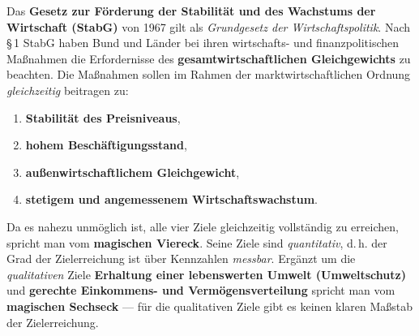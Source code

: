 \documentclass[11pt, a4paper]{article}
\begin{document}
Das \textbf{Gesetz zur Förderung der Stabilität und des Wachstums der Wirtschaft (StabG)}
von 1967 gilt als \emph{Grundgesetz der Wirtschaftspolitik}. Nach \S\,1 StabG haben Bund
und Länder bei ihren wirtschafts- und finanzpolitischen Maßnahmen die Erfordernisse des
\textbf{gesamtwirtschaftlichen Gleichgewichts} zu beachten. Die Maßnahmen sollen im Rahmen
der marktwirtschaftlichen Ordnung \emph{gleichzeitig} beitragen zu:

\begin{enumerate}
  \item \textbf{Stabilität des Preisniveaus},
  \item \textbf{hohem Beschäftigungsstand},
  \item \textbf{außenwirtschaftlichem Gleichgewicht},
  \item \textbf{stetigem und angemessenem Wirtschaftswachstum}.
\end{enumerate}

Da es nahezu unmöglich ist, alle vier Ziele gleichzeitig vollständig zu erreichen, spricht
man vom \textbf{magischen Viereck}. Seine Ziele sind \emph{quantitativ}, d.\,h. der Grad
der Zielerreichung ist über Kennzahlen \emph{messbar}. Ergänzt um die \emph{qualitativen}
Ziele \textbf{Erhaltung einer lebenswerten Umwelt (Umweltschutz)} und \textbf{gerechte
Einkommens- und Vermögensverteilung} spricht man vom \textbf{magischen Sechseck} --- für
die qualitativen Ziele gibt es keinen klaren Maßstab der Zielerreichung.
\end{document}
